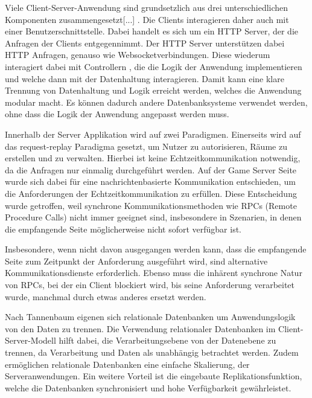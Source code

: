 \documentclass[
]{article}
\begin{document}
\glqq Viele Client-Server-Anwendung sind grundsetzlich aus drei unterschiedlichen Komponenten zusammengesetzt[...]\grqq{} \cite[S.57 ff.]{tanenbaum2007distributed}.
Die Clients interagieren daher auch mit einer Benutzerschnittstelle. Dabei handelt es sich um ein HTTP Server, der die Anfragen der Clients entgegennimmt.
Der HTTP Server unterstützen dabei HTTP Anfragen, genauso wie Websocketverbindungen.
Diese wiederum interagiert dabei mit \glqq Controllern \grqq{}, die die Logik der Anwendung implementieren und welche dann
mit der Datenhaltung interagieren. Damit kann eine klare Trennung von Datenhaltung und Logik erreicht werden, welches die Anwendung
modular macht. Es können dadurch andere Datenbanksysteme verwendet werden, ohne dass die Logik der Anwendung angepasst werden muss.

Innerhalb der Server Applikation wird auf zwei Paradigmen.
Einerseits wird auf das request-replay Paradigma gesetzt, um Nutzer zu autorisieren, Räume zu erstellen und zu verwalten.
Hierbei ist keine Echtzeitkommunikation notwendig, da die Anfragen nur einmalig durchgeführt werden.
Auf der Game Server Seite wurde sich dabei für eine nachrichtenbasierte Kommunikation entschieden, 
um die Anforderungen der Echtzeitkommunikation zu erfüllen. Diese Entscheidung wurde getroffen, 
weil synchrone Kommunikationsmethoden wie RPCs (Remote Procedure Calls) nicht immer geeignet 
sind, insbesondere in Szenarien, in denen die empfangende Seite möglicherweise nicht sofort 
verfügbar ist. 

\glqq Insbesondere, wenn nicht davon ausgegangen werden kann, 
dass die empfangende Seite zum Zeitpunkt der Anforderung ausgeführt wird, 
sind alternative Kommunikationsdienste erforderlich. 
Ebenso muss die inhärent synchrone Natur von RPCs, 
bei der ein Client blockiert wird, bis seine Anforderung verarbeitet wurde, 
manchmal durch etwas anderes ersetzt werden.\grqq{} \cite[S. 140 ff.]{tanenbaum2007distributed}

  

Nach Tannenbaum eigenen sich relationale Datenbanken um Anwendungslogik von den Daten zu trennen.
\glqq Die Verwendung relationaler Datenbanken im Client-Server-Modell hilft dabei, 
die Verarbeitungsebene von der Datenebene zu trennen, da Verarbeitung und Daten als unabhängig betrachtet werden.\grqq{} \cite[S. 40 ff.]{tanenbaum2007distributed}
Zudem ermöglichen relationale Datenbanken eine einfache Skalierung, der Serveranwendungen.
Ein weitere Vorteil ist die eingebaute Replikationsfunktion, welche die Datenbanken synchronisiert und hohe Verfügbarkeit gewährleistet.\cite[Chapter 27]{postgresql-high-availability}
\end{document}

